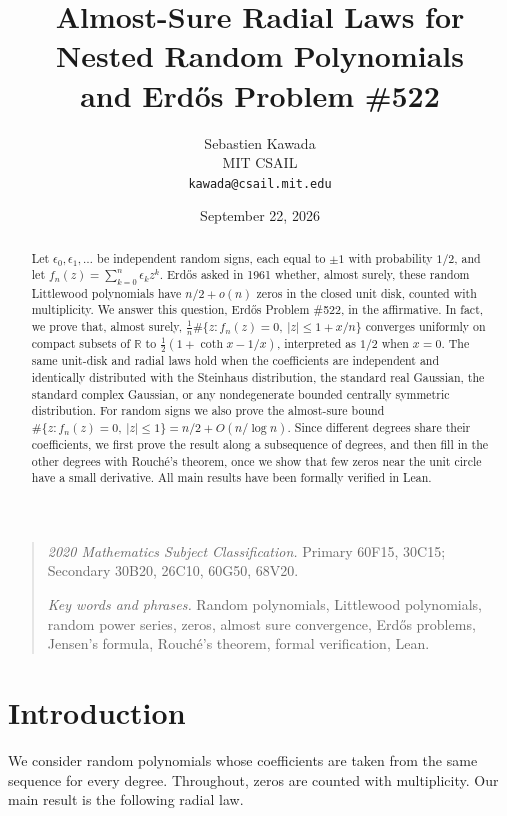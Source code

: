\documentclass[12pt,leqno,twoside]{article}
\title{\Large Almost-Sure Radial Laws for Nested Random Polynomials\\
 and Erd\H{o}s Problem \#522}
\author{Sebastien Kawada\\[2pt]
 {\normalsize MIT CSAIL}\\[2pt]
 {\normalsize\texttt{kawada@csail.mit.edu}}}
\date{September 22, 2026}
\theoremstyle{named}
\theoremstyle{remark}
\begin{document}
\maketitle
\begin{abstract}
Let $\epsilon_0,\epsilon_1,\dots$ be independent random signs, each equal to
$\pm1$ with probability $1/2$, and let $f_n(z)=\sum_{k=0}^n\epsilon_k z^k$.
Erd\H{o}s asked in 1961 whether, almost surely, these random Littlewood
polynomials have $n/2+o(n)$ zeros in the closed unit disk, counted with
multiplicity. We answer this question, Erd\H{o}s Problem \#522, in the
affirmative. In fact, we prove that, almost surely,
$\frac1n\#\{z: f_n(z)=0,\ |z|\le 1+x/n\}$ converges uniformly on compact
subsets of $\mathbb{R}$ to $\frac12(1+\coth x-1/x)$, interpreted as $1/2$
when $x=0$. The same unit-disk and radial laws hold when the coefficients
are independent and identically distributed with the Steinhaus
distribution, the standard real Gaussian, the standard complex Gaussian, or
any nondegenerate bounded centrally symmetric distribution. For random
signs we also prove the almost-sure bound
$\#\{z: f_n(z)=0,\ |z|\le 1\}=n/2+O(n/\log n)$. Since different degrees
share their coefficients, we first prove the result along a subsequence of
degrees, and then fill in the other degrees with Rouch\'e's theorem, once
we show that few zeros near the unit circle have a small derivative. All
main results have been formally verified in Lean.
\end{abstract}
\begin{quotation}\footnotesize\noindent
\emph{2020 Mathematics Subject Classification.} Primary 60F15, 30C15;
Secondary 30B20, 26C10, 60G50, 68V20.\par\nobreak\smallskip
\noindent\emph{Key words and phrases.} Random polynomials, Littlewood
polynomials, random power series, zeros, almost sure convergence,
Erd\H{o}s problems, Jensen's formula, Rouch\'e's theorem, formal
verification, Lean.
\end{quotation}

\tableofcontents

\section{Introduction}\label{sec:introduction}
We consider random polynomials whose coefficients are taken from the
same sequence for every degree. Throughout, zeros are counted with
multiplicity. Our main result is the following radial law.
\end{document}
